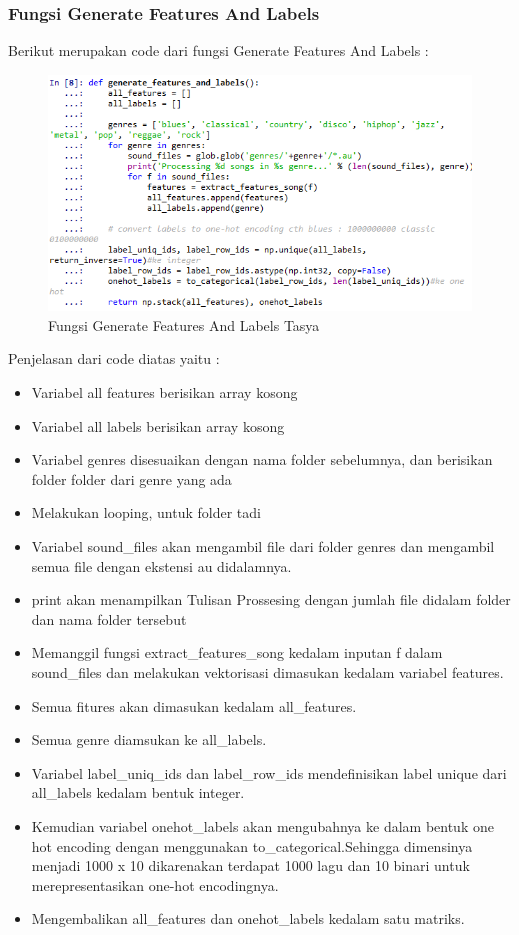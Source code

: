 \begin{enumerate}
\begin{itemize}
\subsubsection{Fungsi Generate Features And Labels}
Berikut merupakan code dari fungsi Generate Features And Labels :\\
\begin{figure}[ht]
\centering
\includegraphics[scale=0.5]{figures/chapter6tasya10.png}
\caption{Fungsi Generate Features And Labels Tasya}
\label{Praktek}
\end{figure}
Penjelasan dari code diatas yaitu :
\begin{itemize}
\item Variabel all features berisikan array kosong
\item Variabel all labels berisikan array kosong
\item Variabel genres disesuaikan dengan nama folder sebelumnya, dan berisikan folder folder dari genre yang ada
\item Melakukan looping, untuk folder tadi
\item Variabel sound\_files akan mengambil file dari folder genres dan mengambil semua file dengan ekstensi au didalamnya.
\item print akan menampilkan Tulisan Prossesing dengan jumlah file didalam folder dan nama folder tersebut
\item Memanggil fungsi extract\_features\_song kedalam inputan f dalam sound\_files dan melakukan vektorisasi dimasukan kedalam variabel features.
\item Semua fitures akan dimasukan kedalam all\_features.
\item Semua genre diamsukan ke all\_labels.
\item Variabel label\_uniq\_ids dan label\_row\_ids mendefinisikan label unique dari all\_labels kedalam bentuk integer.
\item Kemudian variabel onehot\_labels akan mengubahnya ke dalam bentuk one hot encoding dengan menggunakan to\_categorical.Sehingga dimensinya menjadi 1000 x 10 dikarenakan terdapat 1000 lagu dan 10 binari untuk merepresentasikan one-hot encodingnya.
\item Mengembalikan all\_features dan onehot\_labels kedalam satu matriks.
\end{itemize}


\end{itemize}
\end{enumerate}
